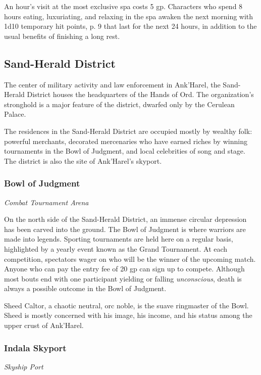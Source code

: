 \documentclass[letterpaper, 11pt, bg=full, twocolumn]{dndbook}
\begin{document}
An hour's visit at the most exclusive spa costs 5 gp. Characters who spend 8 hours eating, luxuriating, and relaxing in the spa awaken the next morning with 1d10 temporary hit points, p. 9 that last for the next 24 hours, in addition to the usual benefits of finishing a long rest.

\subsection{Sand-Herald District}

The center of military activity and law enforcement in Ank'Harel, the Sand-Herald District houses the headquarters of the Hands of Ord. The organization's stronghold is a major feature of the district, dwarfed only by the Cerulean Palace.

The residences in the Sand-Herald District are occupied mostly by wealthy folk: powerful merchants, decorated mercenaries who have earned riches by winning tournaments in the Bowl of Judgment, and local celebrities of song and stage. The district is also the site of Ank'Harel's skyport.

\subsubsection{Bowl of Judgment}

\textit{Combat Tournament Arena}

On the north side of the Sand-Herald District, an immense circular depression has been carved into the ground. The Bowl of Judgment is where warriors are made into legends. Sporting tournaments are held here on a regular basis, highlighted by a yearly event known as the Grand Tournament. At each competition, spectators wager on who will be the winner of the upcoming match. Anyone who can pay the entry fee of 20 gp can sign up to compete. Although most bouts end with one participant yielding or falling \textit{unconscious}, death is always a possible outcome in the Bowl of Judgment.

Sheed Caltor, a chaotic neutral, orc noble, is the suave ringmaster of the Bowl. Sheed is mostly concerned with his image, his income, and his status among the upper crust of Ank'Harel.

\subsubsection{Indala Skyport}

\textit{Skyship Port}
\end{document}
